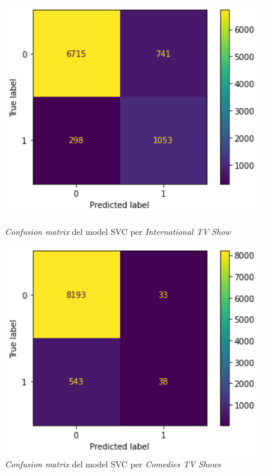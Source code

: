 \documentclass[a4paper, 11pt]{article}
\begin{document}
\begin{figure}[h] %
\begin{minipage}{5cm} %
\begin{center}
    \includegraphics[width=1\textwidth]{ConfMatrix/CM_SVC_internationalTV.png}
    \caption{\textit{Confusion matrix} del model SVC per \textit{International TV Show}}
    \includegraphics[width=1\textwidth]{ConfMatrix/CM_SVC_ComediesTV.png}
    \caption{\textit{Confusion matrix} del model SVC per \textit{Comedies TV Shows}}

\end{center}
\end{minipage}
\end{figure}
\end{document}
